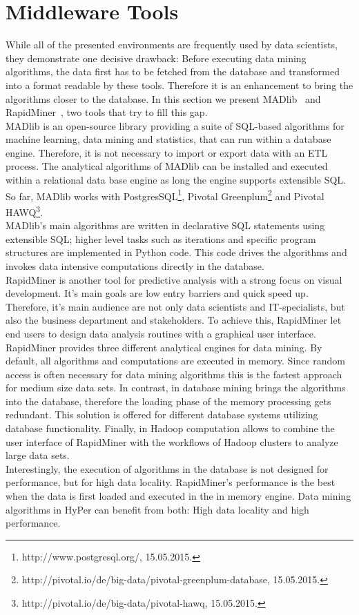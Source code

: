 \section{Middleware Tools}
While all of the presented environments are frequently used by data scientists, they demonstrate one decisive drawback: Before executing data mining algorithms, the data first has to be fetched from the database and transformed into a format readable by these tools. Therefore it is an enhancement to bring the algorithms closer to the database. In this section we present MADlib~\parencite{MADlib} and RapidMiner~\parencite{rapidminer}, two tools that try to fill this gap.
\\
MADlib is an open-source library providing a suite of SQL-based algorithms for machine learning, data mining and statistics, that can run within a database engine. Therefore, it is not necessary to import or export data with an ETL process. The analytical algorithms of MADlib can be installed and executed within a relational data base engine as long the engine supports extensible SQL. So far, MADlib works with PostgresSQL\footnote{http://www.postgresql.org/, 15.05.2015.}, Pivotal Greenplum\footnote{http://pivotal.io/de/big-data/pivotal-greenplum-database, 15.05.2015.} and Pivotal HAWQ\footnote{http://pivotal.io/de/big-data/pivotal-hawq, 15.05.2015.}.
\\
MADlib's main algorithms are written in declarative SQL statements using extensible SQL; higher level tasks such as iterations and specific program structures are implemented in Python code. This code drives the algorithms and invokes data intensive computations directly in the database.
\\
RapidMiner is another tool for predictive analysis with a strong focus on visual development. It's main goals are low entry barriers and quick speed up. Therefore, it's main audience are not only data scientists and IT-specialists, but also the business department and stakeholders. To achieve this, RapidMiner let end users to design data analysis routines with a graphical user interface.
\\
RapidMiner provides three different analytical engines for data mining. By default, all algorithms and computations are executed in memory. Since random access is often necessary for data mining algorithms this is the fastest approach for medium size data sets. In contrast, in database mining brings the algorithms into the database, therefore the loading phase of the memory processing gets redundant. This solution is offered for different database systems utilizing database functionality. Finally, in Hadoop computation allows to combine the user interface of RapidMiner with the workflows of Hadoop clusters to analyze large data sets.
\\
Interestingly, the execution of algorithms in the database is not designed for performance, but for high data locality. RapidMiner's performance is the best when the data is first loaded and executed in the in memory engine. Data mining algorithms in HyPer can benefit from both: High data locality and high performance.


